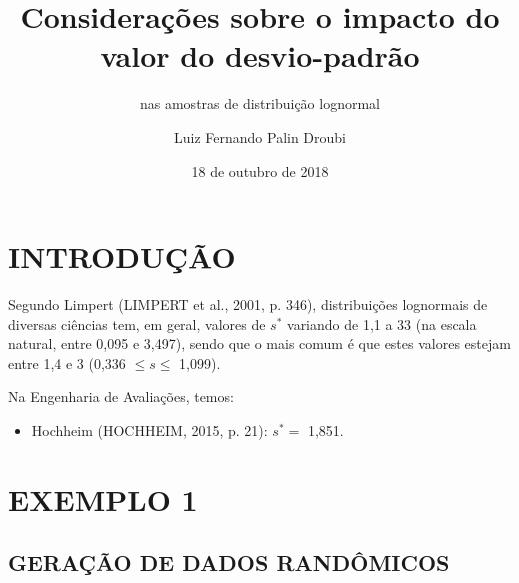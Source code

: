 \documentclass[]{article}
\title{Considerações sobre o impacto do valor do desvio-padrão}
\subtitle{nas amostras de distribuição lognormal}
\author{Luiz Fernando Palin Droubi}
\date{18 de outubro de 2018}
\newenvironment{Shaded}{\begin{snugshade}}{\end{snugshade}}
\newcommand{\KeywordTok}[1]{\textcolor[rgb]{0.13,0.29,0.53}{\textbf{#1}}}
\newcommand{\DataTypeTok}[1]{\textcolor[rgb]{0.13,0.29,0.53}{#1}}
\newcommand{\DecValTok}[1]{\textcolor[rgb]{0.00,0.00,0.81}{#1}}
\newcommand{\StringTok}[1]{\textcolor[rgb]{0.31,0.60,0.02}{#1}}
\newcommand{\OperatorTok}[1]{\textcolor[rgb]{0.81,0.36,0.00}{\textbf{#1}}}
\newcommand{\NormalTok}[1]{#1}
\providecommand{\tightlist}{%
  \setlength{\itemsep}{0pt}\setlength{\parskip}{0pt}}
\begin{document}
\maketitle

\section{INTRODUÇÃO}\label{introducao}

Segundo Limpert (LIMPERT et al., 2001, p. 346), distribuições lognormais
de diversas ciências tem, em geral, valores de \(s^*\) variando de 1,1 a
33 (na escala natural, entre 0,095 e 3,497), sendo que o mais comum é
que estes valores estejam entre 1,4 e 3 (0,336 \(\leq s \leq\) 1,099).

Na Engenharia de Avaliações, temos:

\begin{Shaded}
\end{Shaded}

\begin{itemize}
\tightlist
\item
  Hochheim (HOCHHEIM, 2015, p. 21): \(s^* =\) 1,851.
\end{itemize}

\section{EXEMPLO 1}\label{exemplo-1}

\subsection{GERAÇÃO DE DADOS
RANDÔMICOS}\label{geracao-de-dados-randomicos}
\end{document}
